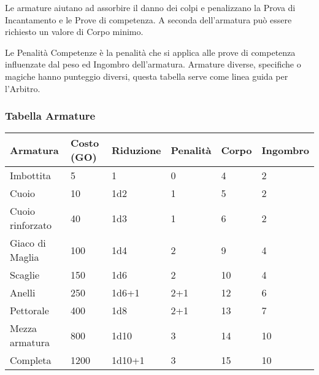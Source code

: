 \documentclass[12pt,a4paper,twoside,openany]{book}
\begin{document}
Le armature aiutano ad assorbire il danno dei colpi e penalizzano la Prova di Incantamento e le Prove di competenza. A seconda dell'armatura può essere richiesto un valore di Corpo minimo.

Le Penalità Competenze è la penalità che si applica alle prove di competenza influenzate dal peso ed Ingombro dell'armatura. Armature diverse, specifiche o magiche hanno punteggio diversi, questa tabella serve come linea guida per l'Arbitro.

\subsubsection{Tabella Armature}

\label{tabella-armature}
\begin{tabular}{llllll}
\textbf{Armatura} & \textbf{Costo (GO)} & \textbf{Riduzione} & \textbf{Penalità} & \textbf{Corpo} &\textbf{Ingombro}\\
\toprule		%
Imbottita  		& 5		& 1		& 0	 & 4  &	2\\
Cuoio 			& 10	& 1d2 	& 1	 & 5  &	2\\
Cuoio rinforzato& 40	& 1d3 	& 1  & 6  & 2\\
Giaco di Maglia & 100 	& 1d4 	& 2  & 9  & 4\\
Scaglie			& 150 	& 1d6 	& 2  & 10 & 4\\
Anelli 			& 250  	& 1d6+1 & 2+1  & 12 & 6\\
Pettorale  		& 400  	& 1d8 	& 2+1  & 13 & 7\\
Mezza armatura  & 800 	& 1d10 	& 3  & 14 & 10\\
Completa		& 1200 	& 1d10+1& 3  & 15 & 10\\
\end{tabular}\bigskip
\end{document}
